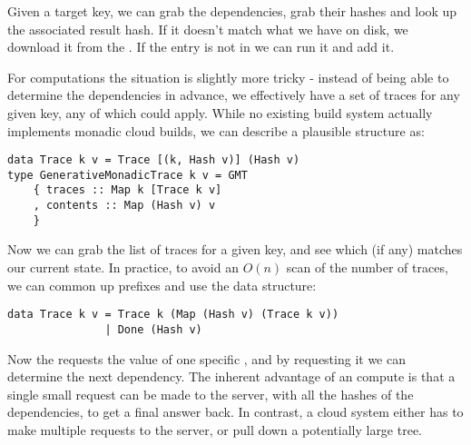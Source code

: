 Given a target key, we can grab the dependencies, grab their hashes and look up the associated result hash. If it doesn't match what we have on disk, we download it from the . If the entry is not in  we can run it and add it.

For  computations the situation is slightly more tricky - instead of being able to determine the dependencies in advance, we effectively have a set of traces for any given key, any of which could apply. While no existing build system actually implements monadic cloud builds, we can describe a plausible structure as:

\begin{verbatim}
data Trace k v = Trace [(k, Hash v)] (Hash v)
type GenerativeMonadicTrace k v = GMT
    { traces :: Map k [Trace k v]
    , contents :: Map (Hash v) v
    }
\end{verbatim}

Now we can grab the list of traces for a given key, and see which (if any) matches our current state. In practice, to avoid an $O(n)$ scan of the number of traces, we can common up prefixes and use the data structure:

\begin{verbatim}
data Trace k v = Trace k (Map (Hash v) (Trace k v))
               | Done (Hash v)
\end{verbatim}

Now the  requests the value of one specific , and by requesting it we can determine the next dependency. The inherent advantage of an  compute is that a single small request can be made to the server, with all the hashes of the dependencies, to get a final answer back. In contrast, a  cloud system either has to make multiple requests to the server, or pull down a potentially large  tree.


